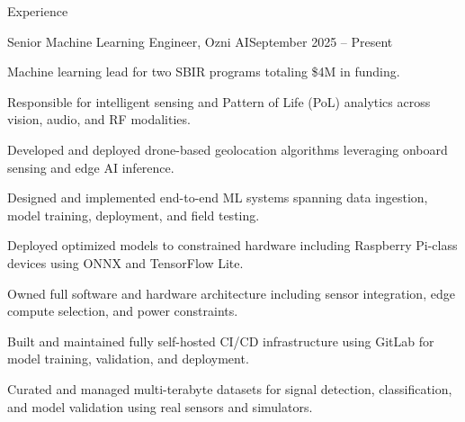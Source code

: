 


\setlength{\itemsep}{-1pt}
\setlength{\parskip}{0.5pt}
\setlength{\parsep}{0pt}
\setlength{\topsep}{1pt}

\begin{rSection}{Experience}
\vspace{1pt}

\begin{rSubsection}{Senior Machine Learning Engineer, Ozni AI}{September 2025 -- Present}{}{}
\item Machine learning lead for two SBIR programs totaling \$4M in funding.
\item Responsible for intelligent sensing and Pattern of Life (PoL) analytics across vision, audio, and RF modalities.
\item Developed and deployed drone-based geolocation algorithms leveraging onboard sensing and edge AI inference.
\item Designed and implemented end-to-end ML systems spanning data ingestion, model training,
deployment, and field testing.
\item Deployed optimized models to constrained hardware including Raspberry Pi-class devices
using ONNX and TensorFlow Lite.
\item Owned full software and hardware architecture including sensor integration,
edge compute selection, and power constraints.
\item Built and maintained fully self-hosted CI/CD infrastructure using GitLab
for model training, validation, and deployment.
\item Curated and managed multi-terabyte datasets for signal detection,
classification, and model validation using real sensors and simulators.
\end{rSubsection}

\vspace{2pt}


\end{rSection}
